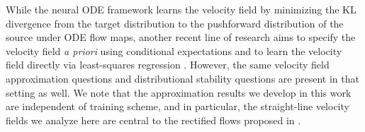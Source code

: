 
While the neural ODE framework learns the velocity field by minimizing the KL divergence from the target distribution to the pushforward distribution of the source under ODE flow maps, another recent line of research  aims to specify the velocity field \textit{a priori} using conditional expectations and to learn the velocity field directly via least-squares regression \citep{StochasticInterpolant1, StochasticInterpoalnt2, FlowMatching, RectifiedFlow}. However, the same velocity field approximation questions and distributional stability questions are present in that setting as well. We note that the approximation results we develop in this work are independent of training scheme, and in particular, the straight-line velocity fields we analyze here are central to the rectified flows proposed in \citet{RectifiedFlow}. 



    



